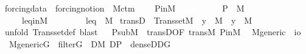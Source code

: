 \begin{isabellebody}
{}
\isamarkuptrue%
%
\endisatagdocument
{\isafolddocument}%
%
\isadelimdocument
%
\endisadelimdocument
{}\isamarkupfalse%
\ forcing{\isacharunderscore}{\kern0pt}data\ {\isacharequal}{\kern0pt}\ forcing{\isacharunderscore}{\kern0pt}notion\ {\isacharplus}{\kern0pt}\ M{\isacharunderscore}{\kern0pt}ctm\ {\isacharplus}{\kern0pt}\isanewline
\ \ \ P{\isacharunderscore}{\kern0pt}in{\isacharunderscore}{\kern0pt}M{\isacharcolon}{\kern0pt}\ \ \ \ \ \ \ \ \ \ \ {\isachardoublequoteopen}P\ {\isasymin}\ M{\isachardoublequoteclose}\isanewline
\ \ \ \ \ leq{\isacharunderscore}{\kern0pt}in{\isacharunderscore}{\kern0pt}M{\isacharcolon}{\kern0pt}\ \ \ \ \ \ \ \ \ {\isachardoublequoteopen}leq\ {\isasymin}\ M{\isachardoublequoteclose}\isanewline
\isanewline
{}\isanewline
\isanewline
{}\isamarkupfalse%
\ transD\ {\isacharcolon}{\kern0pt}\ {\isachardoublequoteopen}Transset{\isacharparenleft}{\kern0pt}M{\isacharparenright}{\kern0pt}\ {\isasymLongrightarrow}\ y\ {\isasymin}\ M\ {\isasymLongrightarrow}\ y\ {\isasymsubseteq}\ M{\isachardoublequoteclose}\ \isanewline
%
\isadelimproof
\ \ %
\endisadelimproof
%
\isatagproof
{}\isamarkupfalse%
\ {\isacharparenleft}{\kern0pt}unfold\ Transset{\isacharunderscore}{\kern0pt}def{\isacharcomma}{\kern0pt}\ blast{\isacharparenright}{\kern0pt}%
\endisatagproof
{\isafoldproof}%
%
\isadelimproof
\ \isanewline
%
\endisadelimproof
\isanewline
\isanewline
{}\isamarkupfalse%
\ P{\isacharunderscore}{\kern0pt}sub{\isacharunderscore}{\kern0pt}M\ {\isacharequal}{\kern0pt}\ transD{\isacharbrackleft}{\kern0pt}OF\ trans{\isacharunderscore}{\kern0pt}M\ P{\isacharunderscore}{\kern0pt}in{\isacharunderscore}{\kern0pt}M{\isacharbrackright}{\kern0pt}\isanewline
\isanewline
{}\isamarkupfalse%
\isanewline
\ \ M{\isacharunderscore}{\kern0pt}generic\ {\isacharcolon}{\kern0pt}{\isacharcolon}{\kern0pt}\ {\isachardoublequoteopen}i{\isasymRightarrow}o{\isachardoublequoteclose}\ \isanewline
\ \ {\isachardoublequoteopen}M{\isacharunderscore}{\kern0pt}generic{\isacharparenleft}{\kern0pt}G{\isacharparenright}{\kern0pt}\ {\isasymequiv}\ filter{\isacharparenleft}{\kern0pt}G{\isacharparenright}{\kern0pt}\ {\isasymand}\ {\isacharparenleft}{\kern0pt}{\isasymforall}D{\isasymin}M{\isachardot}{\kern0pt}\ D{\isasymsubseteq}P\ {\isasymand}\ dense{\isacharparenleft}{\kern0pt}D{\isacharparenright}{\kern0pt}{\isasymlongrightarrow}D{\isasyminter}G{\isasymnoteq}{}{\isacharparenright}{\kern0pt}{\isachardoublequoteclose}\isanewline

\end{isabellebody}
